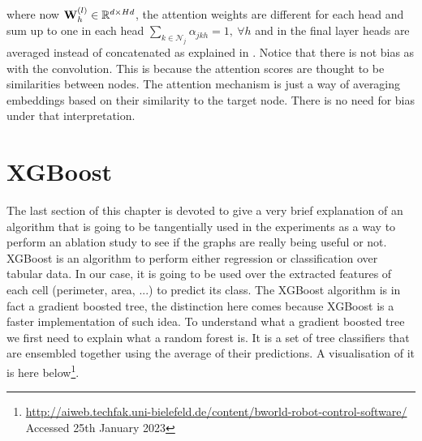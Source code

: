 \noindent where now ${\mathbf W}^{(l)}_h \in \mathbb{R}^{d \times Hd}$, the attention weights are different for each head and sum up to one in each head $\sum_{k\in\mathcal{N}_j}\alpha_{jkh}=1,\ \forall h$ and in the final layer heads are averaged instead of concatenated as explained in \cite{graphatt}. Notice that there is not bias as with the convolution. This is because the attention scores are thought to be similarities between nodes. The attention mechanism is just a way of averaging embeddings based on their similarity to the target node. There is no need for bias under that interpretation.

\section{XGBoost}

The last section of this chapter is devoted to give a very brief explanation of an algorithm that is going to be tangentially used in the experiments as a way to perform an ablation study to see if the graphs are really being useful or not. XGBoost \cite{xgboost} is an algorithm to perform either regression or classification over tabular data. In our case, it is going to be used over the extracted features of each cell (perimeter, area, ...) to predict its class. The XGBoost algorithm is in fact a gradient boosted tree, the distinction here comes because XGBoost is a faster implementation of such idea. To understand what a gradient boosted tree we first need to explain what a random forest is. It is a set of tree classifiers that are ensembled together using the average of their predictions. A visualisation of it is here below\footnote{\url{http://aiweb.techfak.uni-bielefeld.de/content/bworld-robot-control-software/} Accessed 25th January 2023}.

